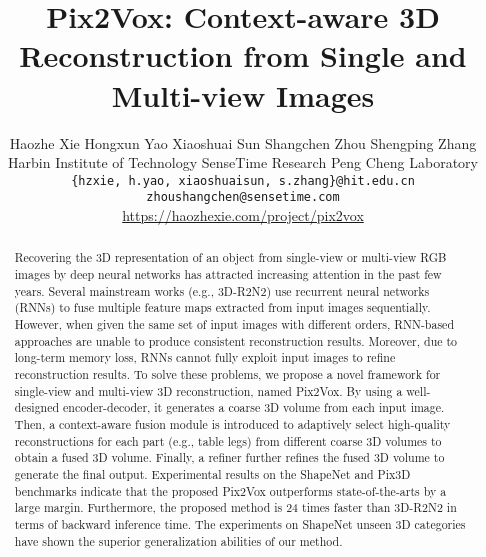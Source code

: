 \documentclass[10pt,twocolumn,letterpaper]{article}
\begin{document}
\title{Pix2Vox: Context-aware 3D Reconstruction from Single and Multi-view Images}

\author{Haozhe Xie\hspace{0.05in}
Hongxun Yao\hspace{0.05in}
Xiaoshuai Sun\hspace{0.05in}
Shangchen Zhou\hspace{0.05in}
Shengping Zhang\\
Harbin Institute of Technology\hspace{0.1in}
SenseTime Research 
Peng Cheng Laboratory \\
{\tt\small\{hzxie, h.yao, xiaoshuaisun, s.zhang\}@hit.edu.cn} 
{\tt\small zhoushangchen@sensetime.com} \\
{\small\url{https://haozhexie.com/project/pix2vox}}
}

\maketitle


\begin{abstract}
Recovering the 3D representation of an object from single-view or multi-view RGB images by deep neural networks has attracted increasing attention in the past few years.
Several mainstream works (e.g., 3D-R2N2) use recurrent neural networks (RNNs) to fuse multiple feature maps extracted from input images sequentially.
However, when given the same set of input images with different orders, RNN-based approaches are unable to produce consistent reconstruction results.
Moreover, due to long-term memory loss, RNNs cannot fully exploit input images to refine reconstruction results.
To solve these problems, we propose a novel framework for single-view and multi-view 3D reconstruction, named Pix2Vox.
By using a well-designed encoder-decoder, it generates a coarse 3D volume from each input image.
Then, a context-aware fusion module is introduced to adaptively select high-quality reconstructions for each part (e.g., table legs) from different coarse 3D volumes to obtain a fused 3D volume.
Finally, a refiner further refines the fused 3D volume to generate the final output.
Experimental results on the ShapeNet and Pix3D benchmarks indicate that the proposed Pix2Vox outperforms state-of-the-arts by a large margin.
Furthermore, the proposed method is 24 times faster than 3D-R2N2 in terms of backward inference time.
The experiments on ShapeNet unseen 3D categories have shown the superior generalization abilities of our method.
\end{abstract}
\end{document}
